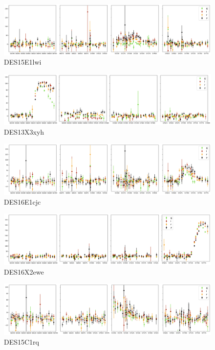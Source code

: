 \begin{figure}[H]
  \centering
  \includegraphics[width=\textwidth]{Figures/Appendix/CNN/1334311.png}
  \caption{DES15E1lwi}
\end{figure}

\begin{figure}[H]
  \centering
  \includegraphics[width=\textwidth]{Figures/Appendix/CNN/1260282.png}
  \caption{DES13X3xyh}
\end{figure}

\begin{figure}[H]
  \centering
  \includegraphics[width=\textwidth]{Figures/Appendix/CNN/1498017.png}
  \caption{DES16E1cjc}
\end{figure}

\begin{figure}[H]
  \centering
  \includegraphics[width=\textwidth]{Figures/Appendix/CNN/1633048.png}
  \caption{DES16X2ewe}
\end{figure}

\begin{figure}[H]
  \centering
  \includegraphics[width=\textwidth]{Figures/Appendix/CNN/1283267.png}
  \caption{DES15C1rq}
\end{figure}

